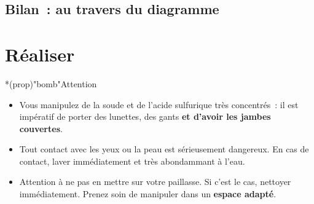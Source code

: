 \documentclass[../main/main.tex]{subfiles}
\begin{document}
%

\subsection{Bilan~: au travers du diagramme}
%

\section{Réaliser}
\begin{tcn}*(prop)"bomb"{Attention}
	\begin{itemize}
		\item Vous manipulez de la soude et de l'acide sulfurique très concentrés~:
		      il est impératif de porter des lunettes, des gants \textbf{et d'avoir les
			      jambes couvertes}.
		\item Tout contact avec les yeux ou la peau est sérieusement dangereux. En
		      cas de contact, laver immédiatement et très abondammant à l'eau.
		\item Attention à ne pas en mettre sur votre paillasse. Si c'est le cas,
		      nettoyer immédiatement. Prenez soin de manipuler dans un \textbf{espace
			      adapté}.
	\end{itemize}
\end{tcn}
\end{document}
